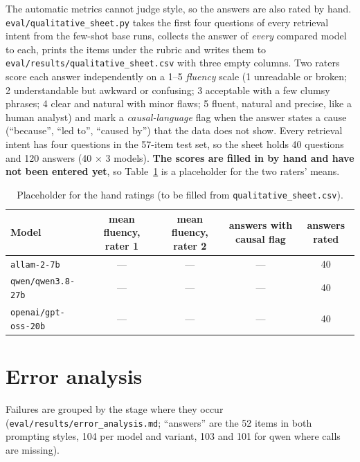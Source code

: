 \documentclass[10pt,a4paper]{article}
\newcommand{\code}[1]{\texttt{#1}}
\begin{document}
The automatic metrics cannot judge style, so the answers are also rated by hand. \code{eval/qualitative\_sheet.py} takes the first four questions of every retrieval intent from the few-shot base runs, collects the answer of \emph{every} compared model to each, prints the items under the rubric and writes them to \code{eval/results/qualitative\_sheet.csv} with three empty columns. Two raters score each answer independently on a 1--5 \emph{fluency} scale (1 unreadable or broken; 2 understandable but awkward or confusing; 3 acceptable with a few clumsy phrases; 4 clear and natural with minor flaws; 5 fluent, natural and precise, like a human analyst) and mark a \emph{causal-language} flag when the answer states a cause (``because'', ``led to'', ``caused by'') that the data does not show. Every retrieval intent has four questions in the 57-item test set, so the sheet holds 40 questions and 120 answers (40 $\times$ 3 models). \textbf{The scores are filled in by hand and have not been entered yet}, so Table~\ref{tab:qual} is a placeholder for the two raters' means.

\begin{table}[H]
\centering\small
\caption{Placeholder for the hand ratings (to be filled from \code{qualitative\_sheet.csv}).}\label{tab:qual}
\begin{tabular}{lcccc}
\toprule
Model & mean fluency, rater 1 & mean fluency, rater 2 & answers with causal flag & answers rated \\
\midrule
\code{allam-2-7b} & --- & --- & --- & 40 \\
\code{qwen/qwen3.8-27b} & --- & --- & --- & 40 \\
\code{openai/gpt-oss-20b} & --- & --- & --- & 40 \\
\bottomrule
\end{tabular}
\end{table}

\section{Error analysis}\label{sec:errors}

Failures are grouped by the stage where they occur (\code{eval/results/error\_analysis.md}; ``answers'' are the 52 items in both prompting styles, 104 per model and variant, 103 and 101 for qwen where calls are missing).
\end{document}
